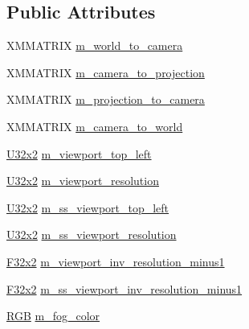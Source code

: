 \subsection*{Public Attributes}
\begin{DoxyCompactItemize}
\item 
X\+M\+M\+A\+T\+R\+IX \hyperlink{structmage_1_1rendering_1_1_camera_buffer_af1ceff883dcc383ce10f2165a5a9a061}{m\+\_\+world\+\_\+to\+\_\+camera}
\item 
X\+M\+M\+A\+T\+R\+IX \hyperlink{structmage_1_1rendering_1_1_camera_buffer_a75669aa0916514b1d414e5a2f7c72c75}{m\+\_\+camera\+\_\+to\+\_\+projection}
\item 
X\+M\+M\+A\+T\+R\+IX \hyperlink{structmage_1_1rendering_1_1_camera_buffer_a9cb9e0e4005d55b72668bbdcf4a27218}{m\+\_\+projection\+\_\+to\+\_\+camera}
\item 
X\+M\+M\+A\+T\+R\+IX \hyperlink{structmage_1_1rendering_1_1_camera_buffer_a0633cfc689f2a097783ecc1626b94590}{m\+\_\+camera\+\_\+to\+\_\+world}
\item 
\hyperlink{namespacemage_a88e05bff0300120c013285d3dcad95c5}{U32x2} \hyperlink{structmage_1_1rendering_1_1_camera_buffer_a6b0e644fb4e7dfd2f55ac4f447cddfac}{m\+\_\+viewport\+\_\+top\+\_\+left}
\item 
\hyperlink{namespacemage_a88e05bff0300120c013285d3dcad95c5}{U32x2} \hyperlink{structmage_1_1rendering_1_1_camera_buffer_a433bdb3d8b4e86fcd04fdb2b794bd0f7}{m\+\_\+viewport\+\_\+resolution}
\item 
\hyperlink{namespacemage_a88e05bff0300120c013285d3dcad95c5}{U32x2} \hyperlink{structmage_1_1rendering_1_1_camera_buffer_a9df1f7b7d6444504fcbc767171b5bfa7}{m\+\_\+ss\+\_\+viewport\+\_\+top\+\_\+left}
\item 
\hyperlink{namespacemage_a88e05bff0300120c013285d3dcad95c5}{U32x2} \hyperlink{structmage_1_1rendering_1_1_camera_buffer_a96b17352187228ee2265be33d3f2d159}{m\+\_\+ss\+\_\+viewport\+\_\+resolution}
\item 
\hyperlink{namespacemage_aa87237ad091f5cd7da612b8523fc108f}{F32x2} \hyperlink{structmage_1_1rendering_1_1_camera_buffer_a87dae6d19b7c84d361ff5304cc0fd637}{m\+\_\+viewport\+\_\+inv\+\_\+resolution\+\_\+minus1}
\item 
\hyperlink{namespacemage_aa87237ad091f5cd7da612b8523fc108f}{F32x2} \hyperlink{structmage_1_1rendering_1_1_camera_buffer_a05e17b19f87ca2a5cb5c75cf04e2796c}{m\+\_\+ss\+\_\+viewport\+\_\+inv\+\_\+resolution\+\_\+minus1}
\item 
\hyperlink{structmage_1_1_r_g_b}{R\+GB} \hyperlink{structmage_1_1rendering_1_1_camera_buffer_a6f963e7d607c59ab0dfc3972e06a9739}{m\+\_\+fog\+\_\+color}

\end{DoxyCompactItemize}
